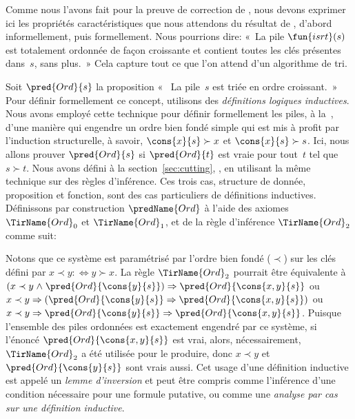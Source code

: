 Comme nous l'avons fait pour la preuve de correction de 
, nous devons exprimer ici les propriétés
caractéristiques que nous attendons du résultat de ,
d'abord informellement, puis formellement. Nous pourrions dire: «~La
pile \(\fun{isrt}(s)\) est totalement
ordonnée de façon croissante et contient toutes les clés présentes
dans~\(s\), sans plus.~» Cela capture tout ce que l'on attend d'un
algorithme de tri.

Soit \(\pred{Ord}{s}\) la proposition «~ La
pile~\(s\) est triée en ordre croissant.~» Pour définir formellement ce
concept, utilisons des \emph{définitions logiques inductives}.
 Nous avons employé cette
technique pour définir formellement les piles, à
la~, d'une manière qui engendre un ordre bien
fondé simple qui est mis à profit par l'induction structurelle, à
savoir, \(\cons{x}{s} \succ x\) et \(\cons{x}{s} \succ s\). Ici, nous
allons prouver \(\pred{Ord}{s}\) si \(\pred{Ord}{t}\) est vraie pour
tout~\(t\) tel que~\(s \succ t\). Nous avons défini  à la
section~\ref{sec:cutting}, , en utilisant la
même technique sur des règles d'inférence. Ces trois cas, structure de
donnée, proposition et fonction, sont des cas particuliers de
définitions inductives. Définissons par construction
\(\predName{Ord}\) à l'aide des axiomes \(\TirName{Ord}_0\) et
\(\TirName{Ord}_1\), et de la règle d'inférence \(\TirName{Ord}_2\)
comme suit:\label{def:Ord}
Notons que ce système est paramétrisé par l'ordre bien fondé
(\(\prec\)) sur les clés défini par \(x \prec y :\Leftrightarrow y
\succ x\). La règle \(\TirName{Ord}_2\) pourrait être équivalente à
\((x \prec y \mathrel{\wedge} \pred{Ord}{\cons{y}{s}}) \Rightarrow
\pred{Ord}{\cons{x,y}{s}}\) ou \(x \prec y \Rightarrow
(\pred{Ord}{\cons{y}{s}} \Rightarrow \pred{Ord}{\cons{x,y}{s}})\) ou
\(x \prec y \Rightarrow \pred{Ord}{\cons{y}{s}} \Rightarrow
\pred{Ord}{\cons{x,y}{s}}\). Puisque l'ensemble des piles ordonnées
est exactement engendré par ce système, si l'énoncé
\(\pred{Ord}{\cons{x,y}{s}}\) est vrai, alors, nécessairement,
\(\TirName{Ord}_2\) a été utilisée pour le produire, donc \(x \prec
y\) et \(\pred{Ord}{\cons{y}{s}}\) sont vrais aussi. Cet usage d'une
définition inductive est appelé un \emph{lemme
  d'inversion} et peut être compris
comme l'inférence d'une condition nécessaire pour une formule
putative, ou comme une \emph{analyse par cas sur une définition
  inductive}.


